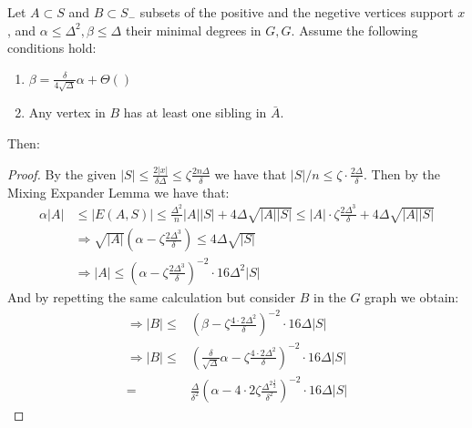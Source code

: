  \begin{claim}  
   \label{cliam:tech} Let $A \subset S$ and $B \subset S_{-}$ subsets of the positive and the negetive vertices support $x$, and $\alpha \le \Delta^{2},\beta \le \Delta$ their minimal degrees in $G, G$. Assume the following conditions hold:
   \begin{enumerate}
     \item $\beta = \frac{\delta}{4 \sqrt{\Delta}}\alpha + \Theta\left(  \right)$
     \item Any vertex in $B$ has at least one sibling in $\bar{A}$.
   \end{enumerate}
   Then:
 \end{claim}

 \begin{proof}
   By the given $|S| \le \frac{2|x|}{\delta\Delta} \le \zeta\frac{2n\Delta}{\delta}$ we have that $|S|/n \le \zeta\cdot \frac{2\Delta}{\delta}$.
   Then by the Mixing Expander Lemma we have that:   
   \begin{equation*}
     \begin{split}
       \alpha |A| & \le |E(A,S)| \le \frac{\Delta^{2}}{n}|A||S| + 4 \Delta \sqrt{|A||S|} \le |A| \cdot \zeta \frac{2\Delta^{3}}{\delta} +  4 \Delta \sqrt{|A||S|}\\ 
       & \Rightarrow \sqrt{|A|}\left(\alpha-\zeta \frac{2\Delta^{3}}{\delta}  \right) \le 4\Delta\sqrt{|S|} \\
       & \Rightarrow |A| \le \left( \alpha -  \zeta \frac{2\Delta^{3}}{\delta}  \right)^{-2} \cdot 16\Delta^{2}|S|
     \end{split}
   \end{equation*}
   And by repetting the same calculation but consider $B$ in the $G$ graph we obtain: 
\begin{equation*}
     \begin{split}
       \Rightarrow  |B| \le & \left( \beta -  \zeta \frac{4 \cdot 2\Delta^{2} }{\delta}  \right)^{-2} \cdot 16\Delta|S|\\
       \Rightarrow  |B| \le & \left( \frac{\delta}{\sqrt{\Delta}}\alpha   -  \zeta \frac{4 \cdot 2\Delta^{2} }{\delta}  \right)^{-2} \cdot 16\Delta|S|\\
       = & \frac{\Delta}{\delta^{2}} \left(  \alpha -  4\cdot 2\zeta \frac{\Delta^{2\frac{1}{2}}}{\delta^{2}}   \right)^{-2} \cdot 16\Delta|S| 

\end{split}
\end{equation*}
\end{proof}
